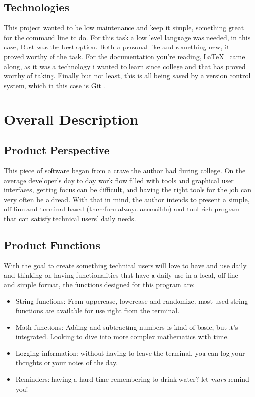 \documentclass{report}
\begin{document}
\section{Technologies}
This project wanted to be low maintenance and keep it simple, something great for the command line to do. For this task a low level language was needed, in this case, Rust \cite{RustProgrammingLanguage} was the best option. Both a personal like and something new, it proved worthy of the task. For the documentation you're reading, \LaTeX\ \cite{LaTeXDocumentPreparation} came along, as it was a technology i wanted to learn since college and that  has proved worthy of taking. Finally but not least, this is all being saved by a version control system, which in this case is Git \cite{Git}.

\chapter{Overall Description}
\section{Product Perspective}
This piece of software began from a crave the author had during college. On the average developer's day to day work flow filled with tools and graphical user interfaces, getting focus can be difficult, and having the right tools for the job can very often be a dread. With that in mind, the author intends to present a simple, off line and terminal based (therefore always accessible) and tool rich program that can satisfy technical users' daily needs.

\section{Product Functions}
With the goal to create something technical users will love to have and use daily and thinking on having functionalities that have a daily use in a local, off line and simple format, the functions designed for this program are:
\begin{itemize}
\item{String functions: From uppercase, lowercase and randomize, most used string functions are available for use right from the terminal.}
\item{Math functions: Adding and subtracting numbers is kind of basic, but it's integrated. Looking to dive into more complex mathematics with time.}
\item{Logging information: without having to leave the terminal, you can log your thoughts or your notes of the day.}
\item{Reminders: having a hard time remembering to drink water? let \emph{mars} remind you!}
\end{itemize}
\end{document}
